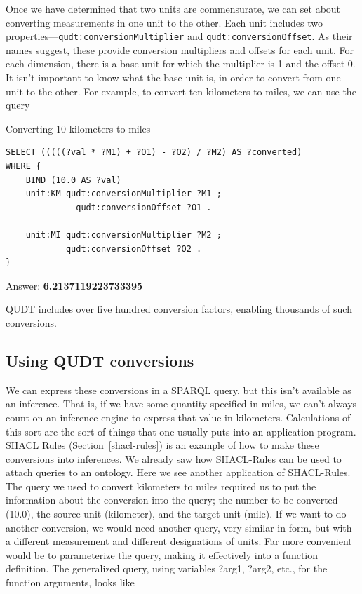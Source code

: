 Once we have determined that two units are commensurate, we can set
about converting measurements in one unit to the other. Each unit
includes two properties---\texttt{qudt:conversionMultiplier} and
\texttt{qudt:conversionOffset}. As their names suggest, these provide conversion
multipliers and offsets for each unit. For each dimension, there is a
base unit for which the multiplier is 1 and the offset 0. It isn't
important to know what the base unit is, in order to convert from one
unit to the other. For example, to convert ten kilometers to miles, we
can use the query

\begin{query}Converting 10 kilometers to miles\end{query}
\begin{lstlisting}
SELECT (((((?val * ?M1) + ?O1) - ?O2) / ?M2) AS ?converted)
WHERE {
    BIND (10.0 AS ?val)
    unit:KM qudt:conversionMultiplier ?M1 ;
              qudt:conversionOffset ?O1 .
    
    unit:MI qudt:conversionMultiplier ?M2 ;
            qudt:conversionOffset ?O2 .
}
\end{lstlisting}


Answer: \textbf{6.2137119223733395}

QUDT includes over five hundred conversion factors, enabling thousands
of such conversions.

\subsection{Using QUDT conversions}

We can express these conversions in a SPARQL query, but this isn't
available as an inference. That is, if we have some quantity specified
in miles, we can't always count on an inference engine to express that
value in kilometers. Calculations of this sort are the sort of things
that one usually puts into an application program. SHACL Rules
(Section~\ref{shacl-rules}) is an example of
how to make these conversions into inferences.  
We already saw how SHACL-Rules can  be used to
attach queries to an ontology. Here we see another application of SHACL-Rules.
The query we used to convert kilometers to miles required us to put the
information about the conversion into the query; the number to be
converted (10.0), the source unit (kilometer), and the target unit
(mile). If we want to do another conversion, we would need another
query, very similar in form, but with a different measurement and
different designations of units. Far more convenient would be to
parameterize the query, making it effectively into a function
definition. The generalized query, using variables ?arg1, ?arg2, etc.,
for the function arguments, looks like

